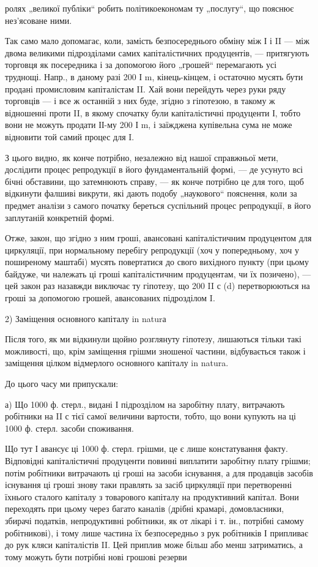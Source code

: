 \parcont{}  %
ролях „великої публіки“ робить політикоекономам ту „послугу“, що
пояснює нез’ясоване ними.

Так само мало допомагає, коли, замість безпосереднього обміну між
І і II — між двома великими підрозділами самих капіталістичних продуцентів,
— притягують торговця як посередника і за допомогою його „грошей“
перемагають усі труднощі. Напр., в даному разі 200 І m, кінець-кінцем,
і остаточно мусять бути продані промисловим капіталістам II. Хай вони
перейдуть через руки ряду торговців — і все ж останній з них буде, згідно
з гіпотезою, в такому ж відношенні проти II, в якому спочатку були
капіталістичні продуценти І, тобто вони не можуть продати ІІ-му 200 І m,
і заїжджена купівельна сума не може відновити той самий процес для I.

З цього видно, як конче потрібно, незалежно від нашої справжньої
мети, дослідити процес репродукції в його фундаментальній формі, —
де усунуто всі бічні обставини, що затемнюють справу, — як конче
потрібно це для того, щоб відкинути фалшиві викрути, які дають подобу
„наукового“ пояснення, коли за предмет аналізи з самого початку
береться суспільний процес репродукції, в його заплутаній конкретній
формі.

Отже, закон, що згідно з ним гроші, авансовані капіталістичним продуцентом
для циркуляції, при нормальному перебігу репродукції (хоч у
попередньому, хоч у поширеному маштабі) мусять повертатися до свого
вихідного пункту (при цьому байдуже, чи належать ці гроші капіталістичним
продуцентам, чи їх позичено), — цей закон раз назавжди виключає
ту гіпотезу, що 200 II с (d) перетворюються на гроші за допомогою
грошей, авансованих підрозділом I.

2) Заміщення основного капіталу in naturа

Після того, як ми відкинули щойно розглянуту гіпотезу, лишаються
тільки такі можливості, що, крім заміщення грішми зношеної частини, відбувається
також і заміщення цілком відмерлого основного капіталу in natura.

До цього часу ми припускали:

а) Що 1000 ф. стерл., видані І підрозділом на заробітну плату, витрачають
робітники на II с тієї самої величини вартости, тобто, що вони
купують на ці 1000 ф. стерл. засоби споживання.

Що тут І авансує ці 1000 ф. стерл. грішми, це є лише констатування
факту. Відповідні капіталістичні продуценти повинні виплатити заробітну
плату грішми; потім робітники витрачають ці гроші на засоби
існування, а для продавців засобів існування ці гроші знову таки правлять
за засіб циркуляції при перетворенні їхнього сталого капіталу
з товарового капіталу на продуктивний капітал. Вони переходять при
цьому через багато каналів (дрібні крамарі, домовласники, збирачі
податків, непродуктивні робітники, як от лікарі і т. ін., потрібні самому
робітникові), і тому лише частина їх безпосередньо з рук робітників І
припливає до рук кляси капіталістів II. Цей приплив може більш або
менш затриматись, а тому можуть бути потрібні нові грошові резерви
\parbreak{}  %
